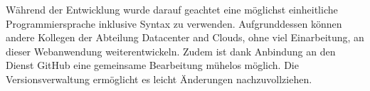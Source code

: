 Während der Entwicklung wurde darauf geachtet eine möglichst einheitliche Programmiersprache inklusive Syntax zu verwenden.
Aufgrunddessen können andere Kollegen der Abteilung Datacenter and Clouds, ohne viel Einarbeitung, an dieser Webanwendung weiterentwickeln.
Zudem ist dank Anbindung an den Dienst GitHub eine gemeinsame Bearbeitung mühelos möglich.
Die Versionsverwaltung ermöglicht es leicht Änderungen nachzuvollziehen.







